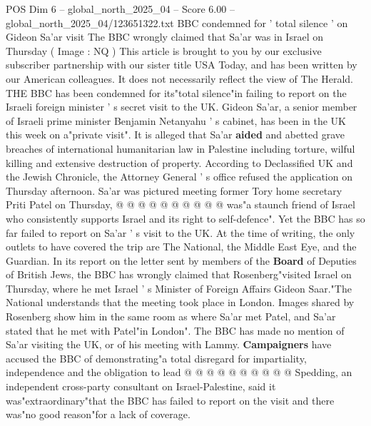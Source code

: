 \begin{textsample}{POS Dim 6 – global\_north\_2025\_04 – Score 6.00 – global\_north\_2025\_04/123651322.txt}  \label{ex:f6_pos_206}
BBC condemned for ' total silence ' on Gideon Sa'ar visit The BBC wrongly claimed that Sa'ar was in Israel on Thursday ( Image : NQ ) This article is brought to you by our exclusive subscriber partnership with our sister title USA Today, and has been written by our American colleagues.
It does not necessarily reflect the view of The Herald.
THE BBC has been condemned for its"total silence"in failing to report on the Israeli foreign minister ' s secret visit to the UK.
Gideon Sa'ar, a senior member of Israeli prime minister Benjamin Netanyahu ' s cabinet, has been in the UK this week on a"private visit".
It is alleged that Sa'ar \textbf{aided} and abetted grave breaches of international humanitarian law in Palestine including torture, wilful killing and extensive destruction of property.
According to Declassified UK and the Jewish Chronicle, the Attorney General ' s office refused the application on Thursday afternoon.
Sa'ar was pictured meeting former Tory home secretary Priti Patel on Thursday, @ @ @ @ @ @ @ @ @ @ was"a staunch friend of Israel who consistently supports Israel and its right to self-defence".
Yet the BBC has so far failed to report on Sa'ar ' s visit to the UK.
At the time of writing, the only outlets to have covered the trip are The National, the Middle East Eye, and the Guardian.
In its report on the letter sent by members of the \textbf{Board} of Deputies of British Jews, the BBC has wrongly claimed that Rosenberg"visited Israel on Thursday, where he met Israel ' s Minister of Foreign Affairs Gideon Saar."The National understands that the meeting took place in London.
Images shared by Rosenberg show him in the same room as where Sa'ar met Patel, and Sa'ar stated that he met with Patel"in London".
The BBC has made no mention of Sa'ar visiting the UK, or of his meeting with Lammy. \textbf{Campaigners} have accused the BBC of demonstrating"a total disregard for impartiality, independence and the obligation to lead @ @ @ @ @ @ @ @ @ @ Spedding, an independent cross-party consultant on Israel-Palestine, said it was"extraordinary"that the BBC has failed to report on the visit and there was"no good reason"for a lack of coverage.

\end{textsample}
